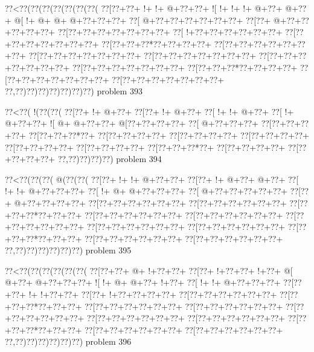 \vbox{\vbox{\goo
\0??<\0??(\0??(\0??(\0??(\0??(\0??(\0??(
\0??[\0??+\0??+\- !+\- !+\- @+\0??+\0??+
\- ![\- !+\- !+\- !+\- @+\0??+\- @+\0??+
\- @[\- !+\- @+\- @+\- @+\0??+\0??+\0??+
\0??[\- @+\0??+\0??+\0??+\0??+\0??+\0??+
\0??[\0??+\- @+\0??+\0??+\0??+\0??+\0??+
\0??[\0??+\0??+\0??+\0??+\0??+\0??+\0??+
\0??[\- !+\0??+\0??+\0??+\0??+\0??+\0??+
\0??[\0??+\0??+\0??+\0??+\0??+\0??+\0??+
\0??[\0??+\0??+\0??*\0??+\0??+\0??+\0??+
\0??[\0??+\0??+\0??+\0??+\0??+\0??+\0??+
\0??[\0??+\0??+\0??+\0??+\0??+\0??+\0??+
\0??[\0??+\0??+\0??+\0??+\0??+\0??+\0??+
\0??[\0??+\0??+\0??+\0??+\0??+\0??+\0??+
\0??[\0??+\0??+\0??+\0??+\0??+\0??+\0??+
\0??[\0??+\0??+\0??*\0??+\0??+\0??+\0??+
\0??[\0??+\0??+\0??+\0??+\0??+\0??+\0??+
\0??[\0??+\0??+\0??+\0??+\0??+\0??+\0??+
\0??,\0??)\0??)\0??)\0??)\0??)\0??)\0??)
}
\hfil problem 393\hfil\break
}

\vbox{\vbox{\goo
\0??<\0??(\- !(\0??(\0??(
\0??[\0??+\- !+\- @+\0??+
\0??[\0??+\- !+\- @+\0??+
\0??[\- !+\- !+\- @+\0??+
\0??[\- !+\- @+\0??+\0??+
\- ![\- @+\- @+\0??+\0??+
\- @[\0??+\0??+\0??+\0??+
\0??[\- @+\0??+\0??+\0??+
\0??[\0??+\0??+\0??+\0??+
\0??[\0??+\0??+\0??*\0??+
\0??[\0??+\0??+\0??+\0??+
\0??[\0??+\0??+\0??+\0??+
\0??[\0??+\0??+\0??+\0??+
\0??[\0??+\0??+\0??+\0??+
\0??[\0??+\0??+\0??+\0??+
\0??[\0??+\0??+\0??*\0??+
\0??[\0??+\0??+\0??+\0??+
\0??[\0??+\0??+\0??+\0??+
\0??,\0??)\0??)\0??)\0??)
}
\hfil problem 394\hfil\break
}

\vbox{\vbox{\goo
\0??<\0??(\0??(\0??(\- @(\0??(\0??(
\0??[\0??+\- !+\- !+\- @+\0??+\0??+
\0??[\0??+\- !+\- @+\0??+\- @+\0??+
\0??[\- !+\- !+\- @+\0??+\0??+\0??+
\0??[\- !+\- @+\- @+\0??+\0??+\0??+
\0??[\- @+\0??+\0??+\0??+\0??+\0??+
\0??[\0??+\- @+\0??+\0??+\0??+\0??+
\0??[\0??+\0??+\0??+\0??+\0??+\0??+
\0??[\0??+\0??+\0??+\0??+\0??+\0??+
\0??[\0??+\0??+\0??*\0??+\0??+\0??+
\0??[\0??+\0??+\0??+\0??+\0??+\0??+
\0??[\0??+\0??+\0??+\0??+\0??+\0??+
\0??[\0??+\0??+\0??+\0??+\0??+\0??+
\0??[\0??+\0??+\0??+\0??+\0??+\0??+
\0??[\0??+\0??+\0??+\0??+\0??+\0??+
\0??[\0??+\0??+\0??*\0??+\0??+\0??+
\0??[\0??+\0??+\0??+\0??+\0??+\0??+
\0??[\0??+\0??+\0??+\0??+\0??+\0??+
\0??,\0??)\0??)\0??)\0??)\0??)\0??)
}
\hfil problem 395\hfil\break
}

\vbox{\vbox{\goo
\0??<\0??(\0??(\0??(\0??(\0??(\0??(
\0??[\0??+\0??+\- @+\- !+\0??+\0??+
\0??[\0??+\- !+\0??+\0??+\- !+\0??+
\- @[\- @+\0??+\- @+\0??+\0??+\0??+
\- ![\- !+\- @+\- @+\0??+\- !+\0??+
\0??[\- !+\- !+\- @+\0??+\0??+\0??+
\0??[\0??+\0??+\- !+\- !+\0??+\0??+
\0??[\0??+\- !+\0??+\0??+\0??+\0??+
\0??[\0??+\0??+\0??+\0??+\0??+\0??+
\0??[\0??+\0??+\0??*\0??+\0??+\0??+
\0??[\0??+\0??+\0??+\0??+\0??+\0??+
\0??[\0??+\0??+\0??+\0??+\0??+\0??+
\0??[\0??+\0??+\0??+\0??+\0??+\0??+
\0??[\0??+\0??+\0??+\0??+\0??+\0??+
\0??[\0??+\0??+\0??+\0??+\0??+\0??+
\0??[\0??+\0??+\0??*\0??+\0??+\0??+
\0??[\0??+\0??+\0??+\0??+\0??+\0??+
\0??[\0??+\0??+\0??+\0??+\0??+\0??+
\0??,\0??)\0??)\0??)\0??)\0??)\0??)
}
\hfil problem 396\hfil\break
}

